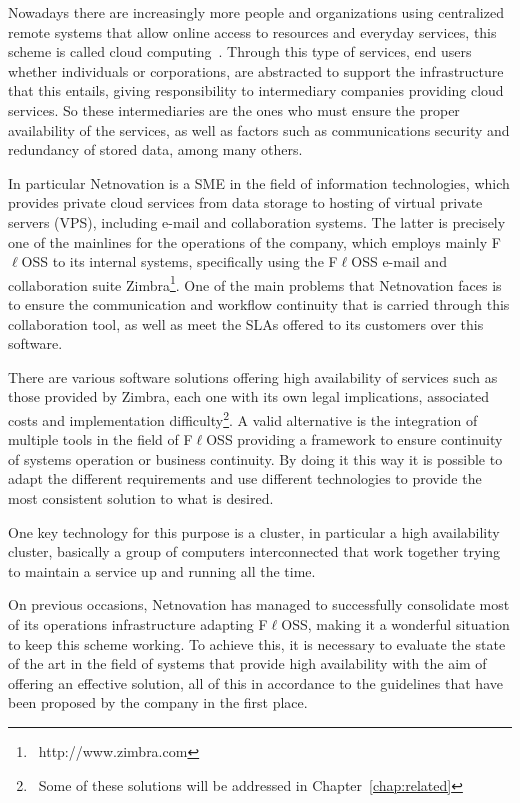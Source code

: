 \documentclass[a4paper, 12pt]{book}
\begin{document}
\noindent Nowadays there are increasingly more people and organizations using centralized remote systems that allow online access to resources and everyday services, this scheme is called cloud computing~\cite{MandG}. Through this type of services, end users whether individuals or corporations, are abstracted to support the infrastructure that this entails, giving responsibility to intermediary companies providing cloud services. So these intermediaries are the ones who must ensure the proper availability of the services, as well as factors such as communications security and redundancy of stored data, among many others.\bigskip

\noindent In particular Netnovation is a SME in the field of information technologies, which provides private cloud services from data storage to hosting of virtual private servers (VPS), including e-mail and collaboration systems. The latter is precisely one of the mainlines for the operations of the company, which employs mainly F$\ell$OSS to its internal systems, specifically using the F$\ell$OSS e-mail and collaboration suite Zimbra\texttrademark\footnote{{\tiny\ http://www.zimbra.com}}. One of the main problems that Netnovation faces is to ensure the communication and workflow continuity that is carried through this collaboration tool, as well as meet the SLAs offered to its customers over this software.\bigskip

\noindent There are various software solutions offering high availability of services such as those provided by Zimbra, each one with its own legal implications, associated costs and implementation difficulty\footnote{\tiny\ Some of these solutions will be addressed in Chapter~\ref{chap:related}}. A valid alternative is the integration of multiple tools in the field of F$\ell$OSS providing a framework to ensure  continuity of systems operation or business continuity. By doing it this way it is possible to adapt the different requirements and use different technologies to provide the most consistent solution to what is desired.\bigskip

\noindent One key technology for this purpose is a cluster, in particular a high availability cluster, basically a group of computers interconnected that work together trying to maintain a service up and running all the time.\bigskip

\noindent On previous occasions, Netnovation has managed to successfully consolidate most of its operations infrastructure adapting F$\ell$OSS, making it a wonderful situation to keep this scheme working. To achieve this, it is necessary to evaluate the state of the art in the field of systems that provide high availability with the aim of offering an effective solution, all of this in accordance to the guidelines that have been proposed by the company in the first place.
\end{document}

